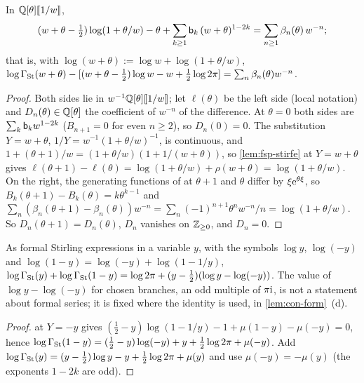 \begin{lem}
\label{lem:fsp-dlmf5118}
In $\mathbb{Q}[\theta][\![ 1/w ]\!]$,
\begin{equation}
\label{eq:fsp-5118}
(w+\theta-\tfrac12)\log(1+\theta/w)-\theta+\sum_{k\geq1}\mathsf{b}_k\,(w+\theta)^{1-2k}=\sum_{n\geq1}\beta_n(\theta)\,w^{-n};
\end{equation}
that is, with $\log(w+\theta):=\log w+\log(1+\theta/w)$, $\log\Gamma_{\mathrm{St}}(w+\theta)-[(w+\theta-\frac12)\log w-w+\frac12\log2\pi]=\sum_n\beta_n(\theta)w^{-n}$.
\end{lem}

\begin{proof}
Both sides lie in $w^{-1}\mathbb{Q}[\theta][\![ 1/w ]\!]$; let $\ell(\theta)$ be the left side (local notation) and $D_n(\theta)\in\mathbb{Q}[\theta]$ the coefficient of $w^{-n}$ of the difference. At $\theta=0$ both sides are $\sum_k\mathsf{b}_kw^{1-2k}$ ($B_{n+1}=0$ for even $n\geq2$), so $D_n(0)=0$. The substitution $Y=w+\theta$, $1/Y=w^{-1}(1+\theta/w)^{-1}$, is continuous, and $1+(\theta+1)/w=(1+\theta/w)(1+1/(w+\theta))$, so \cref{lem:fsp-stirfe} at $Y=w+\theta$ gives $\ell(\theta+1)-\ell(\theta)=\log(1+\theta/w)+\rho(w+\theta)=\log(1+\theta/w)$. On the right, the generating functions of \cite[24.2.3]{DLMF} at $\theta+1$ and $\theta$ differ by $\xi\mathrm{e}^{\theta\xi}$, so $B_k(\theta+1)-B_k(\theta)=k\theta^{k-1}$ \cite[24.4.1]{DLMF} and $\sum_n(\beta_n(\theta+1)-\beta_n(\theta))w^{-n}=\sum_n(-1)^{n+1}\theta^nw^{-n}/n=\log(1+\theta/w)$. So $D_n(\theta+1)=D_n(\theta)$, $D_n$ vanishes on $\mathbb{Z}_{\geq0}$, and $D_n=0$.
\end{proof}

\begin{lem}[Reflection]
\label{lem:fsp-refl}
As formal Stirling expressions in a variable $y$, with the symbols $\log y$, $\log(-y)$ and $\log(1-y)=\log(-y)+\log(1-1/y)$,
$\log\Gamma_{\mathrm{St}}(y)+\log\Gamma_{\mathrm{St}}(1-y)=\log2\pi+(y-\frac12)(\log y-\log(-y))$. The value of $\log y-\log(-y)$ for chosen branches, an odd multiple of $\pi\mathrm{i}$, is not a statement about formal series; it is fixed where the identity is used, in \cref{lem:con-form}~(d).
\end{lem}

\begin{proof}
 at $Y=-y$ gives $(\frac12-y)\log(1-1/y)-1+\mu(1-y)-\mu(-y)=0$, hence $\log\Gamma_{\mathrm{St}}(1-y)=(\frac12-y)\log(-y)+y+\frac12\log2\pi+\mu(-y)$. Add $\log\Gamma_{\mathrm{St}}(y)=(y-\frac12)\log y-y+\frac12\log2\pi+\mu(y)$ and use $\mu(-y)=-\mu(y)$ (the exponents $1-2k$ are odd).
\end{proof}

